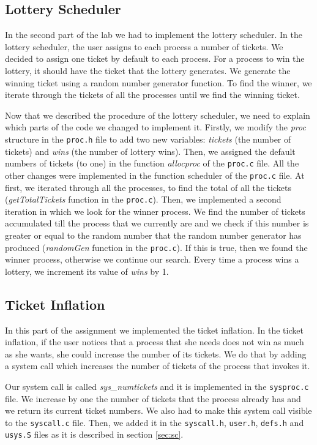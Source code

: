 \documentclass[10pt]{scrartcl}
\begin{document}
\subsection{Lottery Scheduler}
In the second part of the lab we had to implement the lottery scheduler. In the lottery scheduler, the user assigns to each process a number of tickets. We decided to assign one ticket by default to each process. For a process to win the lottery, it should have the ticket that the lottery generates. We generate the winning ticket using a random number generator function. To find the winner, we iterate through the tickets of all the processes until we find the winning ticket. 
\par Now that we described the procedure of the lottery scheduler, we need to explain which parts of the code we changed to implement it. Firstly, we modify the \textit{proc} structure in the \texttt{proc.h} file to add two new variables: \textit{tickets} (the number of tickets) and \textit{wins} (the number of lottery wins). Then, we assigned the default numbers of tickets (to one) in the function \textit{allocproc} of the \texttt{proc.c} file. All the other changes were implemented in the function scheduler of the \texttt{proc.c} file. At first, we iterated through all the processes, to find the  total of all the tickets (\textit{getTotalTickets} function in the \texttt{proc.c}). Then, we implemented a second iteration in which we look for the winner process. We find the number of tickets accumulated till the process that we currently are and we check if this number is greater or equal to the random number that the random number generator has produced (\textit{randomGen} function in the \texttt{proc.c}). If this is true, then we found the winner process, otherwise we continue our search. Every time a process wins a lottery, we increment its value of \textit{wins} by 1.

\subsection{Ticket Inflation}\label{sec:ti}
In this part of the assignment we implemented the ticket inflation. In the ticket inflation, if the user notices that a process that she needs does not win as much as she wants, she could increase  the number of its tickets. We do that by adding a system call which increases the number of tickets of the process that invokes it. 

\par Our system call is called \textit{sys\_numtickets} and it is implemented in the \texttt{sysproc.c} file. We increase by one the number of tickets that the process already has and we return its current ticket numbers. We also had to make this system call visible to the \texttt{syscall.c} file. Then, we added it in the \texttt{syscall.h}, \texttt{user.h}, \texttt{defs.h} and \texttt{usys.S} files as it is described in section \ref{sec:sc}.
\end{document}
